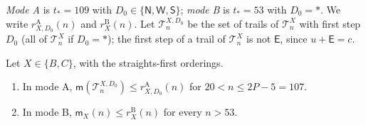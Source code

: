 \emph{Mode A} is $t_* = 109$ with $D_0 \in \{\mathsf N, \mathsf W, \mathsf S\}$; \emph{mode B} is $t_* = 53$ with $D_0 = \ast$. We write $r^{\mathrm A}_{X, D_0}(n)$ and $r^{\mathrm B}_X(n)$. Let $\mathcal T^{X, D_0}_n$ be the set of trails of $\mathcal T^X_n$ with first step $D_0$ (all of $\mathcal T^X_n$ if $D_0 = \ast$); the first step of a trail of $\mathcal T^X_n$ is not $\mathsf E$, since $u + \mathsf E = c$.

\begin{lemma}\label{l:memdom}
Let $X \in \{B, C\}$, with the straights-first orderings.
\begin{enumerate}
\item In mode A, $\mathsf m(\mathcal T^{X, D_0}_n) \le r^{\mathrm A}_{X, D_0}(n)$ for $20 < n \le 2P - 5 = 107$.
\item In mode B, $\mathsf m_X(n) \le r^{\mathrm B}_X(n)$ for every $n > 53$.
\end{enumerate}
\end{lemma}

